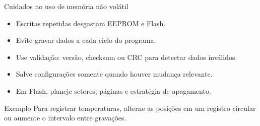 \begin{frame}[t]{Cuidados no uso de memória não volátil}
  \begin{itemize}
    \item Escritas repetidas desgastam EEPROM e Flash.
    \item Evite gravar dados a cada ciclo do programa.
    \item Use validação: versão, checksum ou CRC para detectar dados inválidos.
    \item Salve configurações somente quando houver mudança relevante.
    \item Em Flash, planeje setores, páginas e estratégia de apagamento.
  \end{itemize}
  \begin{alertblock}{Exemplo}
    Para registrar temperaturas, alterne as posições em um registro circular ou aumente o intervalo entre gravações.
  \end{alertblock}
\end{frame}
